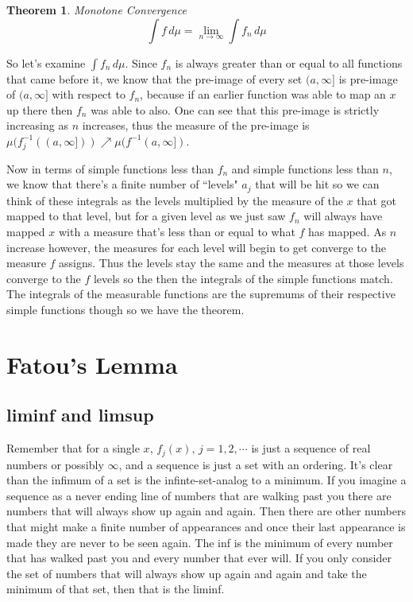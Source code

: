 \documentclass[oneside]{book}
\newtheorem{theorem}{Theorem}[chapter]
\begin{document}
\begin{theorem}{Monotone Convergence}
\begin{equation}
\int f\, d\mu = \lim_{n \to \infty} \int f_n\, d\mu
\end{equation}
\end{theorem}

So let's examine $\int f_n\, d\mu$. Since $f_n$ is always greater than or equal to all functions that came before it, we know that the pre-image of every set $(a,\infty]$ is pre-image of $(a,\infty]$ with respect to $f_n$, because if an earlier function was able to map an $x$ up there then $f_n$ was able to also. One can see that this pre-image is strictly increasing as $n$ increases, thus the measure of the pre-image is $\mu(f_j^{-1}((a,\infty])) \nearrow \mu(f^{-1}(a,\infty])$.

Now in terms of simple functions less than $f_n$ and simple functions less than $n$, we know that there's a finite number of ``levels" $a_j$ that will be hit so we can think of these integrals as the levels multiplied by the measure of the $x$ that got mapped to that level, but for a given level as we just saw $f_n$ will always have mapped $x$ with a measure that's less than or equal to what $f$ has mapped. As $n$ increase however, the measures for each level will begin to get converge to the measure $f$ assigns. Thus the levels stay the same and the measures at those levels converge to the $f$ levels so the then the integrals of the simple functions match. The integrals of the measurable functions are the supremums of their respective simple functions though so we have the theorem.

\section{Fatou's Lemma}

\subsection{liminf and limsup}
Remember that for a single $x$, $f_{j}(x),\, j=1,2,\cdots$ is just a sequence of real numbers or possibly $\infty$, and a sequence is just a set with an ordering. It's clear than the infimum of a set is the infinte-set-analog to a minimum. If you imagine a sequence as a never ending line of numbers that are walking past you there are numbers that will always show up again and again. Then there are other numbers that might make a finite number of appearances and once their last appearance is made they are never to be seen again. The inf is the minimum of every number that has walked past you and every number that ever will. If you only consider the set of numbers that will always show up again and again and take the minimum of that set, then that is the liminf. 
\end{document}
